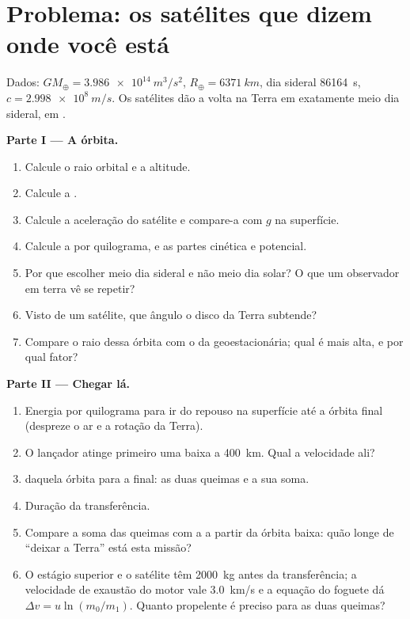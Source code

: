 \section{Problema: os satélites que dizem onde você está}

\begin{problem}
\label{pb:b1:central-forces:1}
Dados: $GM_\oplus = \qty{3.986e14}{m^3/s^2}$, $R_\oplus = \qty{6371}{km}$,
dia sideral \qty{86164}{s}, $c = \qty{2.998e8}{m/s}$. Os satélites
dão a volta na Terra em exatamente meio dia sideral, em .

\medskip
\noindent\textbf{Parte I --- A órbita.}
\begin{enumerate}
  \item Calcule o raio orbital e a altitude.
  \item Calcule a .
  \item Calcule a aceleração do satélite e compare-a com $g$ na
        superfície.
  \item Calcule a  por quilograma, e as partes cinética e
        potencial.
  \item Por que escolher meio dia sideral e não meio dia solar?
        O que um observador em terra vê se repetir?
  \item Visto de um satélite, que ângulo o disco da Terra subtende?
  \item Compare o raio dessa órbita com o da geoestacionária; qual é
        mais alta, e por qual fator?
\end{enumerate}

\medskip
\noindent\textbf{Parte II --- Chegar lá.}
\begin{enumerate}[resume]
  \item Energia por quilograma para ir do repouso na superfície até a órbita
        final (despreze o ar e a rotação da Terra).
  \item O lançador atinge primeiro uma  baixa a \qty{400}{km}.
        Qual a velocidade ali?
  \item {} daquela órbita para a final: as duas queimas
        e a sua soma.
  \item Duração da transferência.
  \item Compare a soma das queimas com a  a partir da órbita
        baixa: quão longe de ``deixar a Terra'' está esta missão?
  \item O estágio superior e o satélite têm \qty{2000}{kg} antes da
        transferência; a velocidade de exaustão do motor vale \qty{3.0}{km/s} e a
        equação do foguete dá $\Delta v = u\ln(m_0/m_1)$. Quanto propelente
        é preciso para as duas queimas?
\end{enumerate}


\end{problem}

